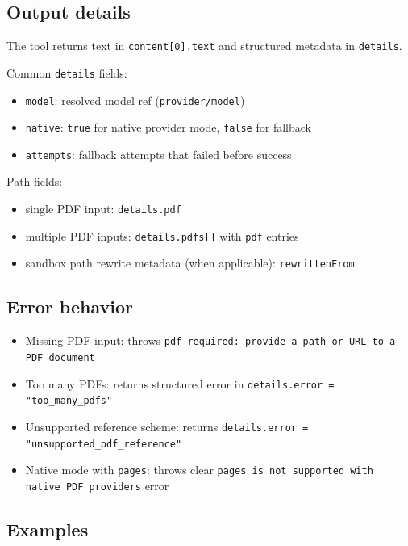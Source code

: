 \subsection{Output details}


The tool returns text in \texttt{content[0].text} and structured metadata in \texttt{details}.

Common \texttt{details} fields:

\begin{itemize}
  \item \texttt{model}: resolved model ref (\texttt{provider/model})
  \item \texttt{native}: \texttt{true} for native provider mode, \texttt{false} for fallback
  \item \texttt{attempts}: fallback attempts that failed before success
\end{itemize}


Path fields:

\begin{itemize}
  \item single PDF input: \texttt{details.pdf}
  \item multiple PDF inputs: \texttt{details.pdfs[]} with \texttt{pdf} entries
  \item sandbox path rewrite metadata (when applicable): \texttt{rewrittenFrom}
\end{itemize}


\subsection{Error behavior}


\begin{itemize}
  \item Missing PDF input: throws \texttt{pdf required: provide a path or URL to a PDF document}
  \item Too many PDFs: returns structured error in \texttt{details.error = "too\_many\_pdfs"}
  \item Unsupported reference scheme: returns \texttt{details.error = "unsupported\_pdf\_reference"}
  \item Native mode with \texttt{pages}: throws clear \texttt{pages is not supported with native PDF providers} error
\end{itemize}


\subsection{Examples}


